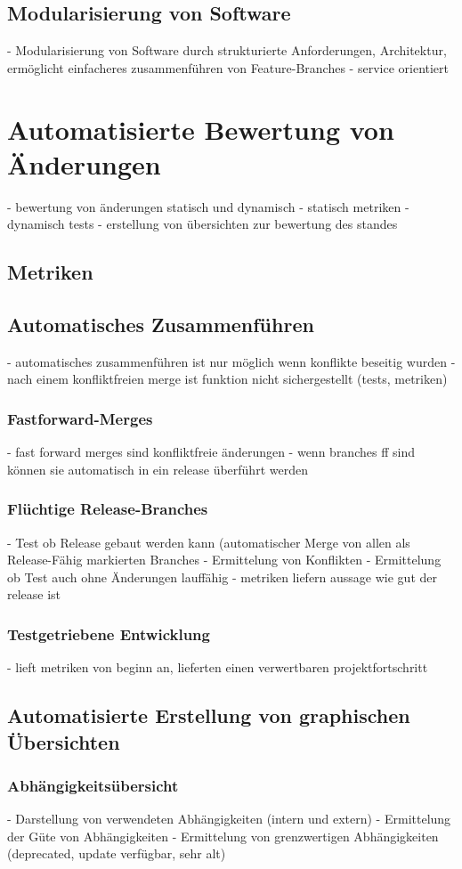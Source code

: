 \subsection{Modularisierung von Software}
- Modularisierung von Software durch strukturierte Anforderungen, Architektur, ermöglicht einfacheres zusammenführen von Feature-Branches
- service orientiert
\section{Automatisierte Bewertung von Änderungen}
- bewertung von änderungen statisch und dynamisch
- statisch metriken
- dynamisch tests
- erstellung von übersichten zur bewertung des standes
\subsection{Metriken}
\label{subsec:auto-values-metrics}
\subsection{Automatisches Zusammenführen}
- automatisches zusammenführen ist nur möglich wenn konflikte beseitig wurden
- nach einem konfliktfreien merge ist funktion nicht sichergestellt (tests, metriken)
\subsubsection{Fastforward-Merges}
- fast forward merges sind konfliktfreie änderungen
- wenn branches ff sind können sie automatisch in ein release überführt werden
\subsubsection{Flüchtige Release-Branches}
- Test ob Release gebaut werden kann (automatischer Merge von allen als Release-Fähig markierten Branches
- Ermittelung von Konflikten
- Ermittelung ob Test auch ohne Änderungen lauffähig
- metriken liefern aussage wie gut der release ist
\subsubsection{Testgetriebene Entwicklung}
- lieft metriken von beginn an, lieferten einen verwertbaren projektfortschritt
\subsection{Automatisierte Erstellung von graphischen Übersichten}
\subsubsection{Abhängigkeitsübersicht}
- Darstellung von verwendeten Abhängigkeiten (intern und extern)
- Ermittelung der Güte von Abhängigkeiten
- Ermittelung von grenzwertigen Abhängigkeiten (deprecated, update verfügbar, sehr alt)
